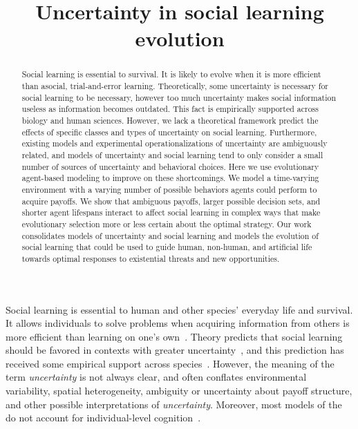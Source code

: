 \documentclass[letterpaper,11.5pt]{scrartcl}
\title{Uncertainty in social learning evolution}
\author{{}}
\begin{document}
\maketitle

\newcommand{\pisub}[1]{\pi_{\mathrm{#1}}}
\newcommand{\pilow}{\pisub{low}}
\newcommand{\pihigh}{\pisub{high}}
\newcommand{\piI}{\langle \pisub{I} \rangle}
\newcommand{\piS}{\langle \pisub{S} \rangle}

\newcommand{\meanvar}[1]{\langle #1 \rangle}
\newcommand{\meansl}{\meanvar{s}}
\newcommand{\meanpi}{\meanvar{\pi}}
\newcommand{\meansoc}{\meanvar{\pi_\mathrm{S}}}
\newcommand{\meanasoc}{\meanvar{\pi_\mathrm{A}}}
\newcommand{\meanT}{\meanvar{T}}

\begin{abstract}

Social learning is essential to survival. It is likely to evolve when it is more
efficient than asocial, trial-and-error learning. Theoretically, some uncertainty is
necessary for social learning to be necessary, however too much uncertainty makes
social information useless as information becomes outdated. This fact is empirically
supported across biology and human sciences. However, we lack a theoretical
framework predict the effects of specific classes and types of uncertainty on social
learning. Furthermore, existing models and experimental operationalizations of
uncertainty are ambiguously related, and models of uncertainty and social learning
tend to only consider a small number of sources of uncertainty and behavioral
choices.  Here we use evolutionary agent-based modeling to improve on these
shortcomings. We model a time-varying environment with a varying number
of possible behaviors agents could perform to acquire payoffs.
We show that ambiguous payoffs, larger possible decision sets, and shorter agent
lifespans interact to affect social learning in complex ways that make evolutionary
selection more or less certain about the optimal strategy. Our work consolidates
models of uncertainty and social learning and models the evolution of social
learning that could be used to guide human, non-human, and artificial life
towards optimal responses to existential threats and new opportunities.
\end{abstract}


Social learning is essential to human and other species' everyday life and survival.
It allows individuals to solve problems when acquiring information from others is
more efficient than learning on one's own~\cite{Laland2004}. Theory predicts that
social learning should be favored in contexts with greater
uncertainty~\cite{BoydRicherson1985,Henrich1998}, and this prediction has received
some empirical support across species~\cite{McElreath2005,Kendal2018,Allen2019}.
However, the meaning of the term \emph{uncertainty} is not always clear, and often
conflates environmental variability, spatial heterogeneity, ambiguity or
uncertainty about payoff structure, and other possible interpretations of
\emph{uncertainty}.  Moreover, most models of the do not account for
individual-level cognition~\cite{Heyes2016}. 
\end{document}
